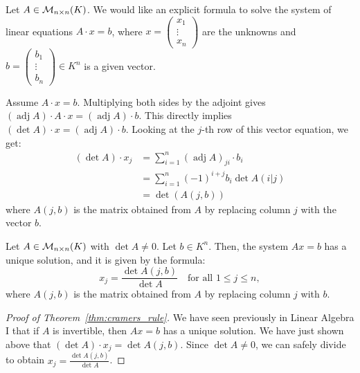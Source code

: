 Let $A \in \mathcal{M}_{n \times n}(K)$. We would like an explicit formula to solve the system of linear equations $A \cdot x = b$, where $x = \left(\begin{smallmatrix} x_1 \\ \vdots \\ x_n \end{smallmatrix}\right)$ are the unknowns and $b = \left(\begin{smallmatrix} b_1 \\ \vdots \\ b_n \end{smallmatrix}\right) \in K^n$ is a given vector.

Assume $A \cdot x = b$. Multiplying both sides by the adjoint gives $(\operatorname{adj} A) \cdot A \cdot x = (\operatorname{adj} A) \cdot b$. This directly implies $(\det A) \cdot x = (\operatorname{adj} A) \cdot b$.
Looking at the $j$-th row of this vector equation, we get:
\begin{align*}
  (\det A) \cdot x_j &= \sum_{i=1}^n (\operatorname{adj} A)_{ji} \cdot b_i \\
  &= \sum_{i=1}^n (-1)^{i+j} b_i \det A(i|j) \\
  &= \det(A(j, b))
\end{align*}
where $A(j, b)$ is the matrix obtained from $A$ by replacing column $j$ with the vector $b$.

\begin{theorem}
  \label{thm:cramers_rule}
  Let $A \in \mathcal{M}_{n \times n}(K)$ with $\det A \neq 0$. Let $b \in K^n$. Then, the system $A x = b$ has a unique solution, and it is given by the formula:
  \[
  x_j = \frac{\det A(j, b)}{\det A} \quad \text{for all } 1 \le j \le n,
  \]
  where $A(j,b)$ is the matrix obtained from $A$ by replacing column $j$ with $b$.
\end{theorem}

\begin{proof}[Proof of Theorem~\ref{thm:cramers_rule}]
  We have seen previously in Linear Algebra I that if $A$ is invertible, then $A x = b$ has a unique solution. We have just shown above that $(\det A) \cdot x_j = \det A(j, b)$. Since $\det A \neq 0$, we can safely divide to obtain $x_j = \frac{\det A(j, b)}{\det A}$.
\end{proof}


